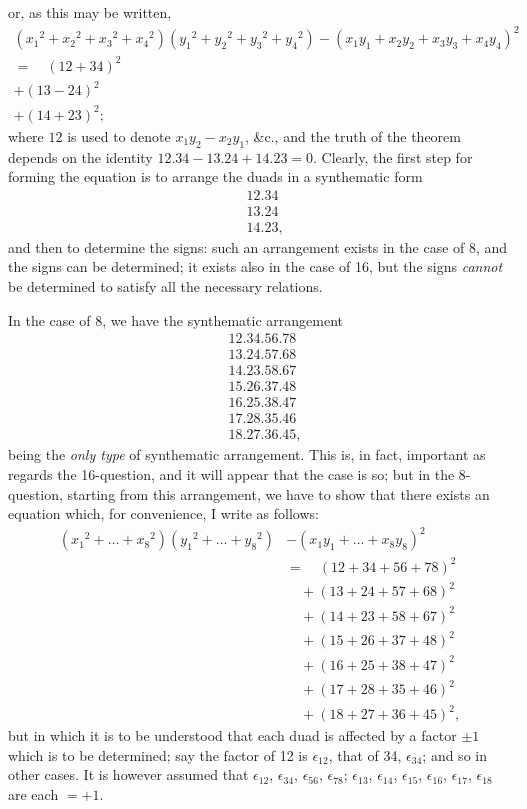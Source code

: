 \documentclass[11pt,a4paper]{book}
\begin{document}
or, as this may be written,
\begin{multline*}
({x_1}^2 + {x_2}^2 + {x_3}^2 + {x_4}^2)({y_1}^2 + {y_2}^2 + {y_3}^2 + {y_4}^2) - (x_1y_1 + x_2y_2 + x_3y_3 + x_4y_4)^2 \\
= \quad (12 + 34)^2 \\
+ (13 - 24)^2 \\
+ (14 + 23)^2;
\end{multline*}
where $12$ is used to denote $x_1y_2 - x_2y_1$, \&c., and the truth of the theorem depends on the identity $12.34 - 13.24 + 14.23 = 0$. Clearly, the first step for forming the equation is to arrange the duads in a synthematic form
\begin{align*}
&12.34 \\
&13.24 \\
&14.23,
\end{align*}
and then to determine the signs: such an arrangement exists in the case of 8, and the signs can be determined; it exists also in the case of 16, but the signs \textit{cannot} be determined to satisfy all the necessary relations.

In the case of 8, we have the synthematic arrangement
\begin{align*}
&12.34.56.78 \\
&13.24.57.68 \\
&14.23.58.67 \\
&15.26.37.48 \\
&16.25.38.47 \\
&17.28.35.46 \\
&18.27.36.45,
\end{align*}
being the \textit{only type} of synthematic arrangement. This is, in fact, important as regards the 16-question, and it will appear that the case is so; but in the 8-question, starting from this arrangement, we have to show that there exists an equation which, for convenience, I write as follows:
\begin{align*}
({x_1}^2 + \ldots + {x_8}^2)({y_1}^2 + \ldots + {y_8}^2) &- (x_1y_1 + \ldots + x_8y_8)^2 \\
&= \quad (12 + 34 + 56 + 78)^2 \\
&\quad + (13 + 24 + 57 + 68)^2 \\
&\quad + (14 + 23 + 58 + 67)^2 \\
&\quad + (15 + 26 + 37 + 48)^2 \\
&\quad + (16 + 25 + 38 + 47)^2 \\
&\quad + (17 + 28 + 35 + 46)^2 \\
&\quad + (18 + 27 + 36 + 45)^2,
\end{align*}
but in which it is to be understood that each duad is affected by a factor $\pm 1$ which is to be determined; say the factor of 12 is $\epsilon_{12}$, that of 34, $\epsilon_{34}$; and so in other cases. It is however assumed that $\epsilon_{12}$, $\epsilon_{34}$, $\epsilon_{56}$, $\epsilon_{78}$; $\epsilon_{13}$, $\epsilon_{14}$, $\epsilon_{15}$, $\epsilon_{16}$, $\epsilon_{17}$, $\epsilon_{18}$ are each $= +1$.
\end{document}
